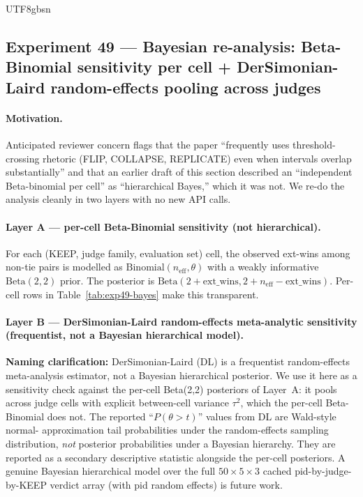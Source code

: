 \documentclass{article}
\begin{document}
\begin{CJK*}{UTF8}{gbsn}
\subsection{Experiment 49 --- Bayesian re-analysis: Beta-Binomial
sensitivity per cell + DerSimonian-Laird random-effects pooling
across judges}
\label{sec:exp49}

\paragraph{Motivation.} Anticipated reviewer concern flags that the
paper ``frequently uses threshold-crossing rhetoric (FLIP,
COLLAPSE, REPLICATE) even when intervals overlap substantially''
and that an earlier draft of this section described an
``independent Beta-binomial per cell'' as ``hierarchical Bayes,''
which it was not. We re-do the analysis cleanly in two layers
with no new API calls.

\paragraph{Layer A --- per-cell Beta-Binomial sensitivity (not
hierarchical).} For each (KEEP, judge family, evaluation set)
cell, the observed ext-wins among non-tie pairs is modelled as
\(\text{Binomial}(n_{\text{eff}}, \theta)\) with a weakly
informative \(\text{Beta}(2, 2)\) prior. The posterior is
\(\text{Beta}(2 + \text{ext\_wins}, 2 + n_{\text{eff}} -
\text{ext\_wins})\). Per-cell rows in Table~\ref{tab:exp49-bayes}
make this transparent.

\paragraph{Layer B --- DerSimonian-Laird random-effects
meta-analytic sensitivity (frequentist, not a Bayesian
hierarchical model).} \textbf{Naming clarification:}
DerSimonian-Laird (DL) is a frequentist
random-effects meta-analysis estimator, not a Bayesian
hierarchical posterior. We use it here as a sensitivity check
against the per-cell Beta(2,2) posteriors of Layer~A: it pools
across judge cells with explicit between-cell variance \(\tau^2\),
which the per-cell Beta-Binomial does not. The reported
``\(P(\theta > t)\)'' values from DL are Wald-style normal-
approximation tail probabilities under the random-effects
sampling distribution, \emph{not} posterior probabilities under
a Bayesian hierarchy. They are reported as a secondary
descriptive statistic alongside the per-cell posteriors. A
genuine Bayesian hierarchical model over the full
\(50 \times 5 \times 3\) cached pid-by-judge-by-KEEP verdict
array (with pid random effects) is future work.


\end{CJK*}
\end{document}
